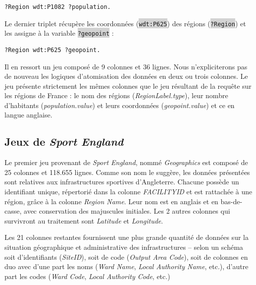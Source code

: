 \documentclass[hidelinks, 12pt]{report}
\newcommand{\code}[1]{\colorbox{LightGray}{\texttt{#1}}}
\begin{document}
\begin{lstlisting}[language=SPARQL]
	?Region wdt:P1082 ?population.
\end{lstlisting}

Le dernier triplet récupère les coordonnées (\code{wdt:P625}) des régions (\code{?Region}) et les assigne à la variable \code{?geopoint} :

\begin{lstlisting}[language=SPARQL]
	?Region wdt:P625 ?geopoint.
\end{lstlisting}

Il en ressort un jeu composé de 9 colonnes et 36 lignes. Nous n'expliciterons pas de nouveau les logiques d'atomisation des données en deux ou trois colonnes. Le jeu présente strictement les mêmes colonnes que le jeu résultant de la requête sur les régions de France : le nom des régions (\textit{RegionLabel.type}), leur nombre d'habitants (\textit{population.value}) et leurs coordonnées (\textit{geopoint.value}) et ce en langue anglaise.





%





\subsection{Jeux de \textit{Sport England}}

Le premier jeu provenant de \textit{Sport England}, nommé \textit{Geographics} est composé de 25 colonnes et 118.655 lignes. Comme son nom le suggère, les données présentées sont relatives aux infrastructures sportives d'Angleterre. Chacune possède un identifiant unique, répertorié dans la colonne \textit{FACILITYID} et est rattachée à une région, grâce à la colonne \textit{Region Name}. Leur nom est en anglais et en bas-de-casse, avec conservation des majuscules initiales. Les 2 autres colonnes qui survivront au traitement sont \textit{Latitude} et \textit{Longitude}.

Les 21 colonnes restantes fournissent une plus grande quantité de données sur la situation géographique et administrative des infrastructures -- selon un schéma soit d'identifiants (\textit{SiteID}), soit de code (\textit{Output Area Code}), soit de colonnes en duo avec d'une part les noms (\textit{Ward Name}, \textit{Local Authority Name}, etc.), d'autre part les codes (\textit{Ward Code}, \textit{Local Authority Code}, etc.)
\end{document}
